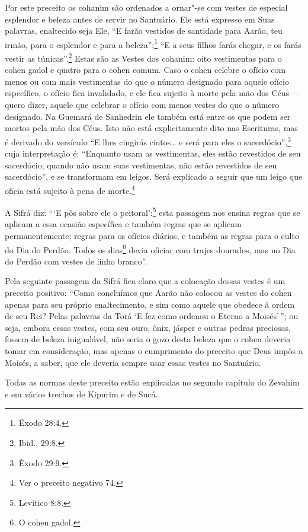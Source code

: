 \begin{multicols}{2}
Por este preceito os cohanim\starr{} são ordenados a ornar"-se com vestes de
especial esplendor e beleza antes de servir no Santuário. Ele está
expresso em Suas palavras, enaltecido seja Ele, ``E farão vestidos de
santidade para Aarão, teu irmão, para o esplendor e para a beleza'';\footnote{Êxodo 28:4.} ``E a
seus filhos farás chegar, e os farás vestir as túnicas''.\footnote{Ibid., 29:8.} Estas
são as Vestes dos cohanim\starr: oito vestimentas para o cohen
gadol\starr{} e quatro para o
cohen\starr{} comum. Caso o cohen\starr{} celebre o ofício com menos ou com mais
vestimentas do que o número designado para aquele ofício específico, o
ofício fica invalidado, e ele fica sujeito à morte pela mão dos Céus ---
quero dizer, aquele que celebrar o ofício com menos vestes do que o
número designado. Na Guemará\starr{} de Sanhedrin\starr{} ele também está entre os que
podem ser mortos pela mão dos Céus. Isto não está explicitamente dito
nas Escrituras, mas é derivado do versículo ``E lhes cingirás cintos\ldots{}
e será para eles o sacerdócio'',\footnote{Êxodo 29:9.} cuja interpretação é:
``Enquanto usam as vestimentas, eles estão revestidos de seu sacerdócio; quando não usam suas vestimentas, não estão
revestidos de seu sacerdócio'', e se transformam em leigos. Será explicado a
seguir que um leigo que oficia está sujeito à pena de
morte.\footnote{Ver o preceito negativo 74.}

A Sifrá\starr{} diz: ```E pôs sobre ele o peitoral':\footnote{Levítico 8:8.} esta passagem nos ensina regras que se aplicam a essa ocasião específica e também regras
que se aplicam permanentemente; regras para os ofícios diários, e também
as regras para o culto do Dia do Perdão. Todos os dias\footnote{O cohen gadol\starr.}
devia oficiar com trajes dourados, mas no Dia do Perdão com vestes de linho branco''.

Pela seguinte passagem da Sifrá\starr{} fica claro que a colocação dessas vestes
é um preceito positivo: ``Como concluímos que Aarão não colocou as
vestes do cohen\starr{} apenas para seu próprio enaltecimento, e sim como
aquele que obedece à ordem de seu Rei? Pelas palavras da Torá\starr{} `E fez
como ordenou o Eterno a Moisés'\,''; ou seja, embora essas vestes, com seu
ouro, ônix, jásper e outras pedras preciosas, fossem de beleza
inigualável, não seria o gozo desta beleza que o cohen\starr{} deveria tomar
em consideração, mas apenas o cumprimento do preceito que Deus impôs a
Moisés, a saber, que ele deveria sempre usar essas vestes no Santuário.

Todas as normas deste preceito estão explicadas no segundo capítulo do
Zevahim\starr{} e em vários trechos de Kipurim\starr{} e de Sucá\starr.


\end{multicols}
